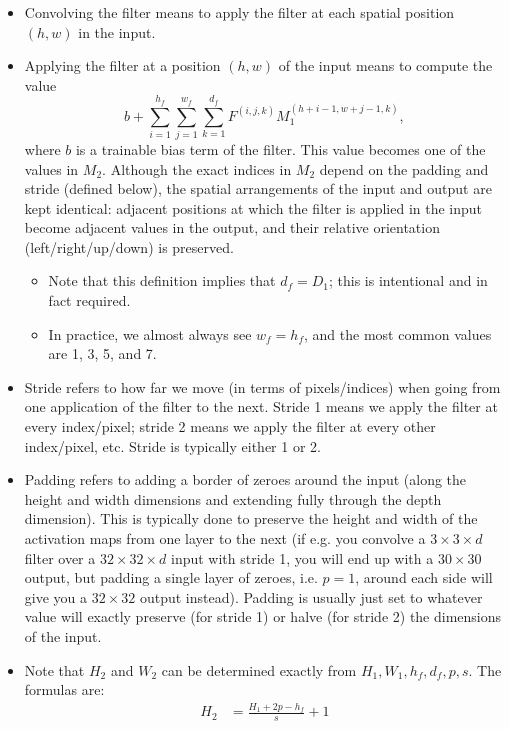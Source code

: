 \begin{itemize}
    \item Convolving the filter means to apply the filter at each spatial position $(h, w)$ in the input.
    \item Applying the filter at a position $(h, w)$ of the input means to compute the value
        $$b + \sum_{i=1}^{h_f}\sum_{j=1}^{w_f}\sum_{k=1}^{d_f} F^{(i, j, k)} M_1^{(h+i-1, w+j-1, k)},$$
        where $b$ is a trainable bias term of the filter. This value becomes one of the values in $M_2$. Although the exact indices in $M_2$ depend on the padding and stride (defined below), the spatial arrangements of the input and output are kept identical: adjacent positions at which the filter is applied in the input become adjacent values in the output, and their relative orientation (left/right/up/down) is preserved.
        \begin{itemize}
            \item Note that this definition implies that $d_f = D_1$; this is intentional and in fact required.
            \item In practice, we almost always see $w_f = h_f$, and the most common values are 1, 3, 5, and 7.
        \end{itemize}
    \item Stride refers to how far we move (in terms of pixels/indices) when going from one application of the filter to the next. Stride 1 means we apply the filter at every index/pixel; stride 2 means we apply the filter at every other index/pixel, etc. Stride is typically either 1 or 2.
    \item Padding refers to adding a border of zeroes around the input (along the height and width dimensions and extending fully through the depth dimension). This is typically done to preserve the height and width of the activation maps from one layer to the next (if e.g. you convolve a $3 \times 3 \times d$ filter over a $32 \times 32 \times d$ input with stride 1, you will end up with a $30 \times 30$ output, but padding a single layer of zeroes, i.e. $p=1$, around each side will give you a $32 \times 32$ output instead). Padding is usually just set to whatever value will exactly preserve (for stride 1) or halve (for stride 2) the dimensions of the input.
    \item Note that $H_2$ and $W_2$ can be determined exactly from $H_1, W_1, h_f, d_f, p, s$. The formulas are:
        \begin{align*}
            H_2 &= \frac{H_1 + 2p - h_f}{s} + 1\\

\end{align*}
\end{itemize}
